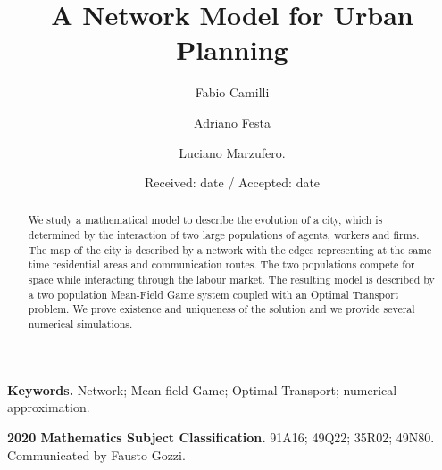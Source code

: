 \documentclass[smallextended,referee,envcountsect,]{svjour3}
\providecommand{\keywords}[1]{\textbf{Keywords.} #1}
\providecommand{\mathsubjclass}[2]{\textbf{2020 Mathematics Subject Classification.} #1}
\begin{document}
\title{A Network Model for Urban Planning}

\author{Fabio Camilli \and Adriano Festa \and Luciano Marzufero.}


\date{Received: date / Accepted: date}

\maketitle

\begin{abstract}
We study a mathematical model to describe the evolution of a city, which is determined by the interaction of two large populations of agents,  workers and firms. The map of the city is described  by a network with the edges representing at the same time residential areas and communication routes. The two populations  compete for space while interacting through the labour market. The resulting model is described by a two population Mean-Field Game system coupled with an Optimal Transport problem. We prove existence and uniqueness of the solution and we provide several numerical simulations.
\end{abstract}
\keywords{Network; Mean-field Game; Optimal Transport;  numerical approximation.}
\par\smallskip\noindent
\mathsubjclass{91A16; 49Q22; 35R02; 49N80.}

\par\smallskip\noindent
Communicated by Fausto Gozzi.
\end{document}
